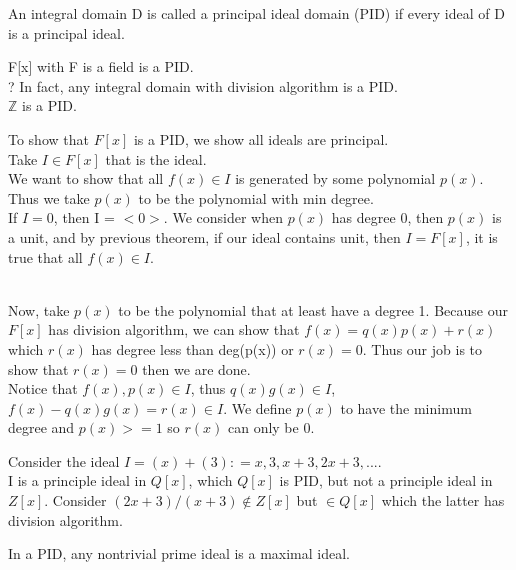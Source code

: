\documentclass{article}
\newcommand\Z{\ensuremath{\mathbb{Z}}}
\begin{document}
\begin{Def}
    An integral domain D is called a principal ideal domain (PID) if every ideal of D is a principal ideal.
\end{Def}
\begin{theorem}
    F[x] with F is a field is a PID. 
    \\? In fact, any integral domain with division algorithm is a PID.
   \\ $\Z$ is a PID.
\end{theorem}
\begin{Proof}
    To show that $F[x]$ is a PID, we show all ideals are principal. 
    \\ Take $I \in F[x]$ that is the ideal.
    \\ We want to show that all $ f(x) \in I$ is generated by some polynomial $p(x)$.
    \\ Thus we take $p(x)$ to be the polynomial with min degree. 
    \\If $I = {0}$, then I = $<0>$. We consider when $p(x)$ has degree 0, then $p(x)$ is a unit, and by previous theorem, if our ideal contains unit, then $I = F[x]$, it is true that all $f(x) \in I$.

    \\Now, take $p(x)$ to be the polynomial that at least have a degree 1. Because our $F[x]$ has division algorithm, we can show that $f(x) = q(x)p(x) + r(x)$ which $r(x)$ has degree less than deg(p(x)) or $r(x) = 0$. Thus our job is to show that $r(x) = 0 $ then we are done.
    \\ Notice that $f(x), p(x) \in I$, thus $q(x)g(x) \in I$, $f(x) - q(x)g(x) = r(x) \in I.$ We define $p(x)$ to have the minimum degree and $p(x)>= 1$ so $r(x)$ can only be 0. 
\end{Proof}

\begin{Example}
    Consider the ideal $I = (x) + (3) : = {x, 3, x+3, 2x+3, ....}$
    \\ I is a principle ideal in $Q[x]$, which $Q[x]$ is PID, but not a principle ideal in $Z[x]$.
    Consider $(2x+3)/(x+3) \notin Z[x]$ but $\in Q[x]$ which the latter has division algorithm.
    
\end{Example}


\begin{theorem}
    In a PID, any nontrivial prime ideal is a maximal ideal.
\end{theorem}
\end{document}
